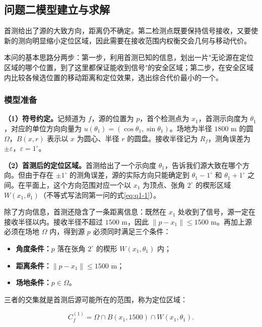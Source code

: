 \subsection{问题二模型建立与求解}\label{sec:q2}

首测给出了源的大致方向，距离仍不确定。第二检测点既要保持信号接收，又要使新的测向明显缩小定位区域，因此需要在接收范围内权衡交会几何与移动代价。

本问的基本思路分两步：第一步，利用首测已知的信息，划出一片"无论源在定位区域的哪个位置，到了这里都保证能收到信号"的安全区域；第二步，在安全区域内比较各候选位置的移动距离和定位效果，选出综合代价最小的一个。

\subsubsection{模型准备}\label{sec:q2-1}

\textbf{（1）符号约定。}记频道为 $f$，源的位置为 $p$，首个检测点为 $x_1$，首测示向度为 $\theta_1$，对应的单位方向向量为 $u(\theta_1)=(\cos\theta_1,\sin\theta_1)$。场地为半径 $1800$ m 的圆 $\Omega$，$B(x,r)$ 表示以 $x$ 为圆心、半径 $r$ 的圆盘。接收半径记为 $R_f$，测角误差为 $\pm\varepsilon$，$\varepsilon=1^\circ$。

\textbf{（2）首测后的定位区域。}首测给出了一个示向度 $\theta_1$，告诉我们源大致在哪个方向。但由于存在 $\pm1^\circ$ 的测角误差，源的实际方向只能确定到 $\theta_1-1^\circ$ 和 $\theta_1+1^\circ$ 之间。在平面上，这个方向范围对应一个以 $x_1$ 为顶点、张角 $2^\circ$ 的楔形区域 $W(x_1,\theta_1)$（不等式写法同第一问的式\eqref{eq:q1-1}）。

除了方向信息，首测还隐含了一条距离信息：既然在 $x_1$ 处收到了信号，源一定在接收半径以内。接收半径不超过 $1500$ m，因此 $\|p-x_1\|\le1500$ m。再加上源必须在场地 $\Omega$ 内，得到源 $p$ 必须同时满足三个条件：

\begin{itemize}
\item \textbf{角度条件：}$p$ 落在张角 $2^\circ$ 的楔形 $W(x_1,\theta_1)$ 内；
\item \textbf{距离条件：}$\|p-x_1\|\le1500$ m；
\item \textbf{场地条件：}$p\in\Omega$。
\end{itemize}

三者的交集就是首测后源可能所在的范围，称为定位区域：

\begin{equation}\label{eq:q2-1}
C_f^{(1)}=\Omega\cap B(x_1,1500)\cap W(x_1,\theta_1).
\end{equation}

